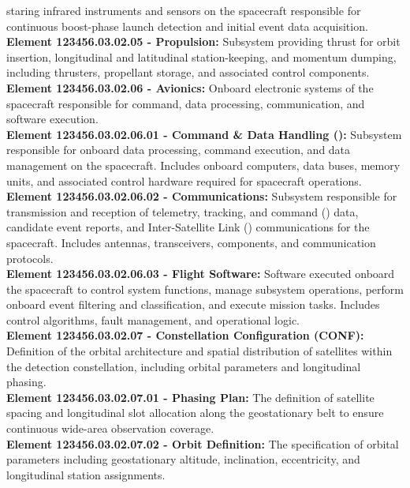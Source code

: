 staring infrared instruments and sensors on the  spacecraft responsible for continuous
boost-phase launch detection and initial event data acquisition.\\
\textbf{Element 123456.03.02.05 - Propulsion:} Subsystem providing thrust for
 orbit insertion, longitudinal and latitudinal station-keeping, and momentum
dumping, including thrusters, propellant storage, and associated control components.\\
\textbf{Element 123456.03.02.06 - Avionics:} Onboard electronic systems of the 
spacecraft responsible for command, data processing, communication, and software execution.\\
\textbf{Element 123456.03.02.06.01 - Command \& Data Handling ():} Subsystem
responsible for onboard data processing, command execution, and data
management on the  spacecraft. Includes onboard computers, data buses, memory
units, and associated control hardware required for spacecraft operations.\\
\textbf{Element 123456.03.02.06.02 - Communications:} Subsystem responsible for
transmission and reception of telemetry, tracking, and command () data,
candidate event reports, and Inter-Satellite Link () communications for the 
spacecraft. Includes antennas, transceivers,  components, and communication protocols.\\
\textbf{Element 123456.03.02.06.03 - Flight Software:} Software executed onboard the
 spacecraft to control system functions, manage subsystem operations, perform
onboard event filtering and classification, and execute mission tasks. Includes control
algorithms, fault management, and operational logic.\\
\textbf{Element 123456.03.02.07 - Constellation Configuration (CONF):} Definition of the orbital
architecture and spatial distribution of satellites within the  detection constellation,
including orbital parameters and longitudinal phasing.\\
\textbf{Element 123456.03.02.07.01 - Phasing Plan:} The definition of  satellite
spacing and longitudinal slot allocation along the geostationary belt to ensure continuous
wide-area observation coverage.\\
\textbf{Element 123456.03.02.07.02 - Orbit Definition:} The specification of  orbital
parameters including geostationary altitude, inclination, eccentricity, and longitudinal station
assignments.

